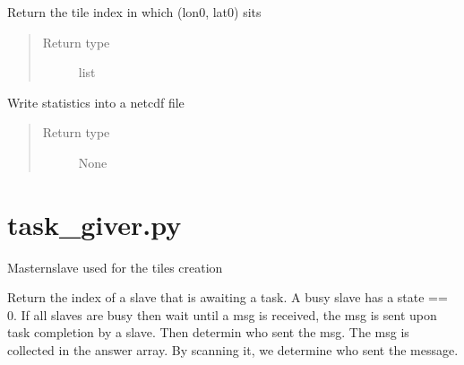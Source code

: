 \documentclass[letterpaper,10pt,english]{sphinxmanual}
\begin{document}

\begin{fulllineitems}
\label{\detokenize{pargopy:pargopy.stats.retrieve_tile_from_position}}
Return the tile index in which (lon0, lat0) sits
\begin{quote}\begin{description}
\item[{Return type}] \leavevmode
list

\end{description}\end{quote}

\end{fulllineitems}


\begin{fulllineitems}
\label{\detokenize{pargopy:pargopy.stats.write_stat_file}}
Write statistics into a netcdf file
\begin{quote}\begin{description}
\item[{Return type}] \leavevmode
None

\end{description}\end{quote}

\end{fulllineitems}



\section{task\_giver.py}
\label{\detokenize{pargopy:task-giver-py}}\label{\detokenize{pargopy:module-pargopy.task_giver}}
Masternslave used for the tiles creation

\begin{fulllineitems}
\label{\detokenize{pargopy:pargopy.task_giver.getavailableslave}}
Return the index of a slave that is awaiting a task.  A busy slave
has a state == 0. If all slaves are busy then wait until a msg is
received, the msg is sent upon task completion by a slave. Then
determin who sent the msg. The msg is collected in the answer
array. By scanning it, we determine who sent the message.

\end{fulllineitems}
\end{document}
